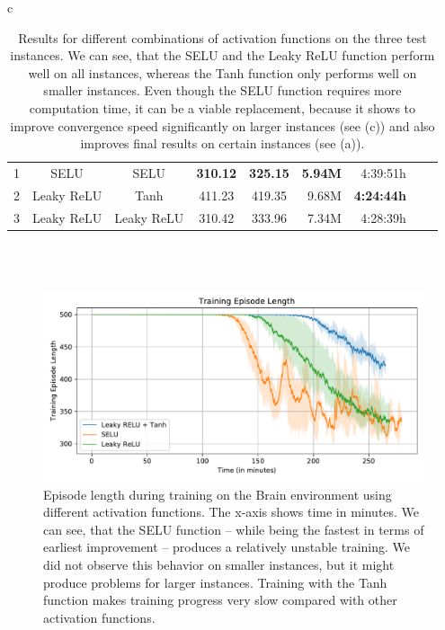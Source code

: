 \begin{table}[ht]
\begin{center}
\begin{tabular}{c}
\begin{tabular}{rccccrrrr}
                \midrule
                1 & SELU & SELU & \textbf{310.12} & \textbf{325.15} & \textbf{5.94M} & 4:39:51h \\
                2 & Leaky ReLU & Tanh & 411.23 & 419.35 & 9.68M & \textbf{4:24:44h} \\
                3 & Leaky ReLU & Leaky ReLU & 310.42 & 333.96 & 7.34M & 4:28:39h \\
                \bottomrule
            \end{tabular}\\
             \\
        \end{tabular}
    \end{center}
    \caption[Evaluation Results for Different Combinations of Activation Functions]{Results for different combinations of activation functions on the three test instances. We can see, that the SELU and the Leaky ReLU function perform well on all instances, whereas the Tanh function only performs well on smaller instances. Even though the SELU function requires more computation time, it can be a viable replacement, because it shows to improve convergence speed significantly on larger instances (see (c)) and also improves final results on certain instances (see (a)).} \label{tab:Eval/ActivationFunctions}
\end{table}

\begin{figure}[htp]
    \begin{center}
        \includegraphics[clip, width=0.98\columnwidth]{figures/evaluation/networks/maze0122_ep_len.pdf}
    \end{center}
    \caption[Training Episode Length Using Different Activation Functions on the Brain Environment]{Episode length during training on the Brain environment using different activation functions. The x-axis shows time in minutes. We can see, that the SELU function -- while being the fastest in terms of earliest improvement -- produces a relatively unstable training. We did not observe this behavior on smaller instances, but it might produce problems for larger instances. Training with the Tanh function makes training progress very slow compared with other activation functions.} \label{fig:Eval/ActivationFunctions/Maze0122}
\end{figure}


